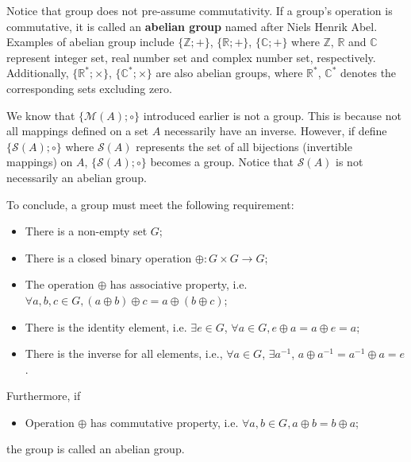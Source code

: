 Notice that group does not pre-assume commutativity. If a group's operation is commutative, it is called an \textbf{abelian group} named after Niels Henrik Abel. Examples of abelian group include $\{\mathbb{Z}; +\}$, $\{\mathbb{R}; +\}$, $\{\mathbb{C}; +\}$ where $\mathbb{Z}$, $\mathbb{R}$ and $\mathbb{C}$ represent integer set, real number set and complex number set, respectively. Additionally, $\{\mathbb{R}^{*}; \times \}$, $\{\mathbb{C}^{*}; \times \}$ are also abelian groups, where $\mathbb{R}^*$,  $\mathbb{C}^*$ denotes the corresponding sets excluding zero.

We know that $\{\mathcal{M}(A); \circ\}$ introduced earlier is not a group. This is because not all mappings defined on a set $A$ necessarily have an inverse. However, if define $\{\mathcal{S}(A); \circ\}$ where $\mathcal{S}(A)$ represents the set of all  bijections (invertible mappings) on $A$, $\{\mathcal{S}(A); \circ\}$ becomes a group. Notice that $\mathcal{S}(A)$ is not necessarily an abelian group.

To conclude, a group must meet the following requirement:
\begin{itemize}
	\item There is a non-empty set $G$;
	\item There is a closed binary operation $\oplus: G\times G \rightarrow G$;
	\item The operation $\oplus$ has associative property, i.e. $\forall a, b, c \in G, (a \oplus b) \oplus c = a\oplus (b \oplus c)$;
	\item There is the identity element, i.e. $\exists e\in G$, $\forall a \in G, e\oplus a = a \oplus e = a$;
	\item There is the inverse for all elements, i.e., $\forall a\in G$, $\exists a^{-1}$, $a\oplus a^{-1} = a^{-1}\oplus a = e$.
\end{itemize}
Furthermore, if
\begin{itemize}
	\item Operation $\oplus$ has commutative property, i.e. $\forall a, b\in G, a\oplus b=b\oplus a$;
\end{itemize}
the group is called an abelian group.

